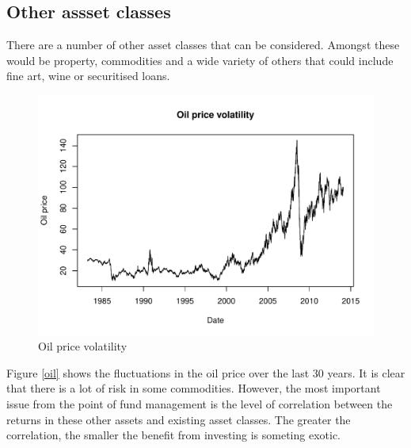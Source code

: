 \documentclass[12pt, a4paper, oneside]{article}\usepackage{graphicx, color}
\makeatletter
\def\maxwidth{ %
  \ifdim\Gin@nat@width>\linewidth
    \linewidth
  \else
    \Gin@nat@width
  \fi
}
\newenvironment{knitrout}{}{} %
\makeatother
\begin{document}
\subsection{Other assset classes}
There are a number of other asset classes that can be considered.  Amongst these would be property, commodities and a wide variety of others that could include fine art, wine or securitised loans.    
\begin{knitrout}
\color{fgcolor}\begin{figure}[]

\includegraphics[width=\maxwidth]{figure/oil} \caption[Oil price volatility]{Oil price volatility\label{fig:oil}}
\end{figure}


\end{knitrout}

Figure \ref{oil} shows the fluctuations in the oil price over the last 30 years.  It is clear that there is a lot of risk in some commodities.  However, the most important issue from the point of fund management is the level of correlation between the returns in these other assets and existing asset classes.  The greater the correlation, the smaller the benefit from investing is someting exotic.  
\end{document}
